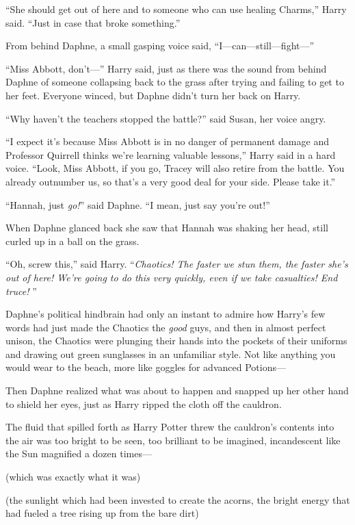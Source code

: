“She should get out of here and to someone who can use healing
Charms,” Harry said. “Just in case that broke something.”

From behind Daphne, a small gasping voice said, “I—can—still—fight—”

“Miss Abbott, don’t—” Harry said, just as there was the sound
from behind Daphne of someone collapsing back to the grass after
trying and failing to get to her feet. Everyone winced, but Daphne
didn’t turn her back on Harry.

“Why haven’t the teachers stopped the battle?” said Susan, her
voice angry.

“I expect it’s because Miss Abbott is in no danger of permanent
damage and Professor Quirrell thinks we’re learning valuable
lessons,” Harry said in a hard voice. “Look, Miss Abbott, if you
go, Tracey will also retire from the battle. You already outnumber
us, so that’s a very good deal for your side. Please take it.”

“Hannah, just \emph{go!}” said Daphne. “I mean, just say you’re
out!”

When Daphne glanced back she saw that Hannah was shaking her
head, still curled up in a ball on the grass.

“Oh, screw this,” said Harry. “\emph{Chaotics! The faster we stun
them, the faster she’s out of here! We’re going to do this very
quickly, even if we take casualties! End truce! }”

Daphne’s political hindbrain had only an instant to admire how
Harry’s few words had just made the Chaotics the \emph{good} guys,
and then in almost perfect unison, the Chaotics were plunging their
hands into the pockets of their uniforms and drawing out green
sunglasses in an unfamiliar style. Not like anything you would wear
to the beach, more like goggles for advanced Potions—

Then Daphne realized what was about to happen and snapped up her
other hand to shield her eyes, just as Harry ripped the cloth off
the cauldron.

The fluid that spilled forth as Harry Potter threw the
cauldron’s contents into the air was too bright to be seen, too
brilliant to be imagined, incandescent like the Sun magnified a
dozen times—

(which was exactly what it was)

(the sunlight which had been invested to create the acorns, the
bright energy that had fueled a tree rising up from the bare
dirt)

